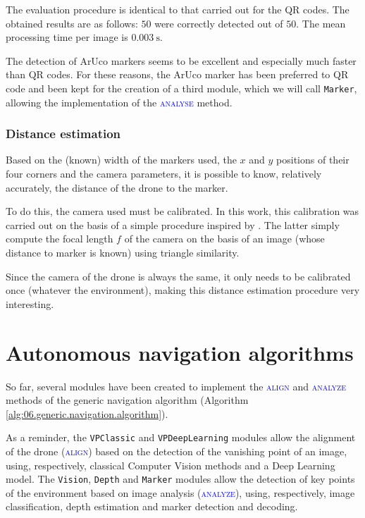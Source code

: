 The evaluation procedure is identical to that carried out for the QR codes. The obtained results are as follows: $\num{50}$ were correctly detected out of $\num{50}$. The mean processing time per image is $\SI{0.003}{\second}$.

The detection of ArUco markers seems to be excellent and especially much faster than QR codes. For these reasons, the ArUco marker has been preferred to QR code and been kept for the creation of a third module, which we will call \texttt{Marker}, allowing the implementation of the \textsc{\textcolor{blue}{analyse}} method.

\subsubsection{Distance estimation}

Based on the (known) width of the markers used, the $x$ and $y$ positions of their four corners and the camera parameters, it is possible to know, relatively accurately, the distance of the drone to the marker.

To do this, the camera used must be calibrated. In this work, this calibration was carried out on the basis of a simple procedure inspired by \cite{pyimagesearch2015calibration}. The latter simply compute the focal length $f$ of the camera on the basis of an image (whose distance to marker is known) using triangle similarity.

Since the camera of the drone is always the same, it only needs to be calibrated once (whatever the environment), making this distance estimation procedure very interesting.

\section{Autonomous navigation algorithms}

So far, several modules have been created to implement the \textsc{\textcolor{blue}{align}} and \textsc{\textcolor{blue}{analyze}} methods of the generic navigation algorithm (Algorithm \ref{alg:06.generic.navigation.algorithm}).

As a reminder, the \texttt{VPClassic} and \texttt{VPDeepLearning} modules allow the alignment of the drone (\textsc{\textcolor{blue}{align}}) based on the detection of the vanishing point of an image, using, respectively, classical Computer Vision methods and a Deep Learning model. The \texttt{Vision}, \texttt{Depth} and \texttt{Marker} modules allow the detection of key points of the environment based on image analysis (\textsc{\textcolor{blue}{analyze}}), using, respectively, image classification, depth estimation and marker detection and decoding.


